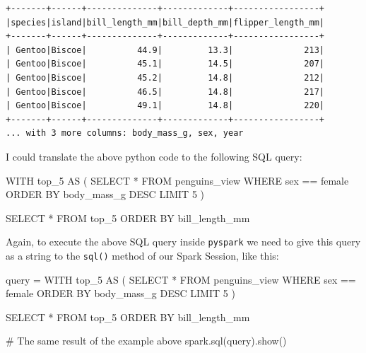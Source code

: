 \documentclass[
  11pt,
  letterpaper,
  DIV=11,
  numbers=noendperiod]{scrreprt}
\newenvironment{Shaded}{\begin{snugshade}}{\end{snugshade}}
\newcommand{\CommentTok}[1]{\textcolor[rgb]{0.37,0.37,0.37}{#1}}
\newcommand{\DecValTok}[1]{\textcolor[rgb]{0.68,0.00,0.00}{#1}}
\newcommand{\KeywordTok}[1]{\textcolor[rgb]{0.00,0.23,0.31}{#1}}
\newcommand{\NormalTok}[1]{\textcolor[rgb]{0.00,0.23,0.31}{#1}}
\newcommand{\OperatorTok}[1]{\textcolor[rgb]{0.37,0.37,0.37}{#1}}
\newcommand{\StringTok}[1]{\textcolor[rgb]{0.13,0.47,0.30}{#1}}
\begin{document}
\begin{verbatim}
+-------+------+--------------+-------------+-----------------+
|species|island|bill_length_mm|bill_depth_mm|flipper_length_mm|
+-------+------+--------------+-------------+-----------------+
| Gentoo|Biscoe|          44.9|         13.3|              213|
| Gentoo|Biscoe|          45.1|         14.5|              207|
| Gentoo|Biscoe|          45.2|         14.8|              212|
| Gentoo|Biscoe|          46.5|         14.8|              217|
| Gentoo|Biscoe|          49.1|         14.8|              220|
+-------+------+--------------+-------------+-----------------+
... with 3 more columns: body_mass_g, sex, year
\end{verbatim}

I could translate the above python code to the following SQL query:

\begin{Shaded}
\begin{Highlighting}[]
\KeywordTok{WITH}\NormalTok{ top\_5 }\KeywordTok{AS}\NormalTok{ (}
    \KeywordTok{SELECT} \OperatorTok{*}
    \KeywordTok{FROM}\NormalTok{ penguins\_view}
    \KeywordTok{WHERE}\NormalTok{ sex }\OperatorTok{==} \StringTok{\textquotesingle{}female\textquotesingle{}}
    \KeywordTok{ORDER} \KeywordTok{BY}\NormalTok{ body\_mass\_g }\KeywordTok{DESC}
    \KeywordTok{LIMIT} \DecValTok{5}
\NormalTok{)}

\KeywordTok{SELECT} \OperatorTok{*}
\KeywordTok{FROM}\NormalTok{ top\_5}
\KeywordTok{ORDER} \KeywordTok{BY}\NormalTok{ bill\_length\_mm}
\end{Highlighting}
\end{Shaded}

Again, to execute the above SQL query inside \texttt{pyspark} we need to
give this query as a string to the \texttt{sql()} method of our Spark
Session, like this:

\begin{Shaded}
\begin{Highlighting}[]
\NormalTok{query }\OperatorTok{=} \StringTok{\textquotesingle{}\textquotesingle{}\textquotesingle{}}
\StringTok{WITH top\_5 AS (}
\StringTok{    SELECT *}
\StringTok{    FROM penguins\_view}
\StringTok{    WHERE sex == \textquotesingle{}female\textquotesingle{}}
\StringTok{    ORDER BY body\_mass\_g DESC}
\StringTok{    LIMIT 5}
\StringTok{)}

\StringTok{SELECT *}
\StringTok{FROM top\_5}
\StringTok{ORDER BY bill\_length\_mm}
\StringTok{\textquotesingle{}\textquotesingle{}\textquotesingle{}}

\CommentTok{\# The same result of the example above}
\NormalTok{spark.sql(query).show()}
\end{Highlighting}
\end{Shaded}
\end{document}
